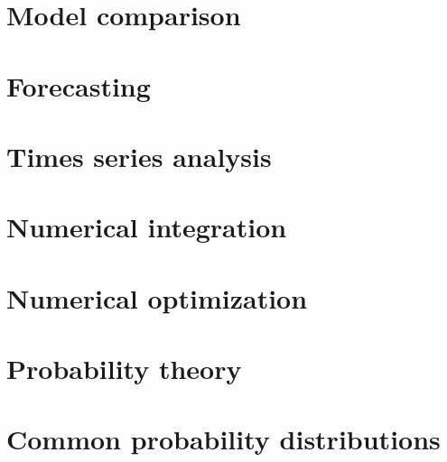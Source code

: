 \documentclass[12pt]{report}
\theoremstyle{definition}
\begin{document}
\chapter{Model comparison}
\label{chap:model-comparison}

\chapter{Forecasting}
\label{chap:forecasting}

\chapter{Times series analysis}
\label{chap:time-series-analysis}

\chapter{Numerical integration}
\label{chap:numerical-integration}

\chapter{Numerical optimization}
\label{chap:numerical-optmization}

\appendix

\chapter{Probability theory}
\label{chap:probability-theory}


\chapter{Common probability distributions}
\label{chap:probability-distributions}

\end{document}

